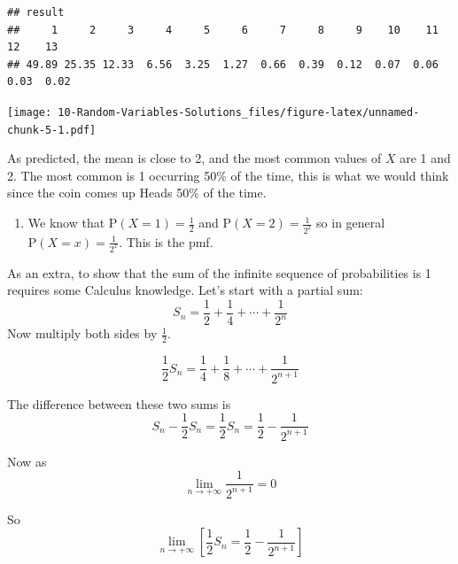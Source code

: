 \documentclass[
]{book}
\newenvironment{Shaded}{\begin{snugshade}}{\end{snugshade}}
\newcommand{\DataTypeTok}[1]{\textcolor[rgb]{0.13,0.29,0.53}{#1}}
\newcommand{\KeywordTok}[1]{\textcolor[rgb]{0.13,0.29,0.53}{\textbf{#1}}}
\newcommand{\NormalTok}[1]{#1}
\newcommand{\OperatorTok}[1]{\textcolor[rgb]{0.81,0.36,0.00}{\textbf{#1}}}
\newcommand{\StringTok}[1]{\textcolor[rgb]{0.31,0.60,0.02}{#1}}
\providecommand{\tightlist}{%
  \setlength{\itemsep}{0pt}\setlength{\parskip}{0pt}}
\begin{document}
\begin{verbatim}
## result
##     1     2     3     4     5     6     7     8     9    10    11    12    13 
## 49.89 25.35 12.33  6.56  3.25  1.27  0.66  0.39  0.12  0.07  0.06  0.03  0.02
\end{verbatim}

\begin{Shaded}
\end{Shaded}

\texttt{[image: 10-Random-Variables-Solutions\_files/figure-latex/unnamed-chunk-5-1.pdf]}

As predicted, the mean is close to 2, and the most common values of \(X\) are 1 and 2. The most common is 1 occurring 50\% of the time, this is what we would think since the coin comes up Heads 50\% of the time.

\begin{enumerate}
\def\labelenumi{\alph{enumi}.}
\setcounter{enumi}{3}
\tightlist
\item
  We know that \(\mbox{P}(X=1) = \frac{1}{2}\) and \(\mbox{P}(X=2) = \frac{1}{2^2}\) so in general \(\mbox{P}(X=x) = \frac{1}{2^x}\). This is the pmf.
\end{enumerate}

As an extra, to show that the sum of the infinite sequence of probabilities is 1 requires some Calculus knowledge. Let's start with a partial sum:
\[S_n=\frac{1}{2}+\frac{1}{4} +\cdots + \frac{1}{2^n}\]
Now multiply both sides by \(\frac{1}{2}\).

\[\frac{1}{2}S_n=\frac{1}{4}+\frac{1}{8} +\cdots + \frac{1}{2^{n+1}}\]

The difference between these two sums is
\[S_n-\frac{1}{2}S_n=\frac{1}{2}S_n=\frac{1}{2}-\frac{1}{2^{n+1}}\]

Now as \[\lim_{n \to +\infty} \frac{1}{2^{n+1}} = 0\]

So \[\lim_{n \to +\infty} \left[ \frac{1}{2}S_n=\frac{1}{2}-\frac{1}{2^{n+1}} \right]\]
\end{document}

